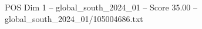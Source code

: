 \begin{textsample}{POS Dim 1 – global\_south\_2024\_01 – Score 35.00 – global\_south\_2024\_01/105004686.txt}
\end{textsample}

